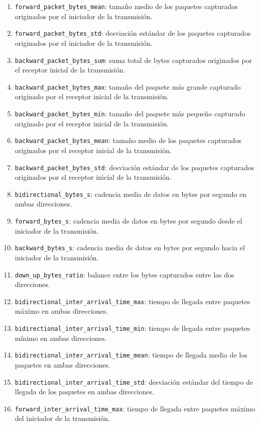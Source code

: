 \begin{enumerate}
  \item \texttt{forward\_packet\_bytes\_mean}: tamaño medio de los paquetes capturados originados por el iniciador de la transmisión.
  \item \texttt{forward\_packet\_bytes\_std}: desviación estándar de los paquetes capturados originados por el iniciador de la transmisión.
  \item \texttt{backward\_packet\_bytes\_sum}: suma total de bytes capturados originados por el receptor inicial de la transmisión.
  \item \texttt{backward\_packet\_bytes\_max}: tamaño del paquete más grande capturado originado por el receptor inicial de la transmisión.
  \item \texttt{backward\_packet\_bytes\_min}: tamaño del paquete más pequeño capturado originado por el receptor inicial de la transmisión.
  \item \texttt{backward\_packet\_bytes\_mean}: tamaño medio de los paquetes capturados originados por el receptor inicial de la transmisión. 
  \item \texttt{backward\_packet\_bytes\_std}: desviación estándar de los paquetes capturados originados por el receptor inicial de la transmisión.
  \item \texttt{bidirectional\_bytes\_s}: cadencia media de datos en bytes por segundo en ambas direcciones.
  \item \texttt{forward\_bytes\_s}: cadencia media de datos en bytes por segundo desde el iniciador de la transmisión.
  \item \texttt{backward\_bytes\_s}: cadencia media de datos en bytes por segundo hacia el iniciador de la transmisión.
  \item \texttt{down\_up\_bytes\_ratio}: balance entre los bytes capturados entre las dos direcciones.
  \item \texttt{bidirectional\_inter\_arrival\_time\_max}: tiempo de llegada entre paquetes máximo en ambas direcciones.
  \item \texttt{bidirectional\_inter\_arrival\_time\_min}: tiempo de llegada entre paquetes mínimo en ambas direcciones.
  \item \texttt{bidirectional\_inter\_arrival\_time\_mean}: tiempo de llegada media de los paquetes en ambas direcciones.
  \item \texttt{bidirectional\_inter\_arrival\_time\_std}: desviación estándar del tiempo de llegada de los paquetes en ambas direcciones.
  \item \texttt{forward\_inter\_arrival\_time\_max}: tiempo de llegada entre paquetes máximo del iniciador de la transmisión.

\end{enumerate}
